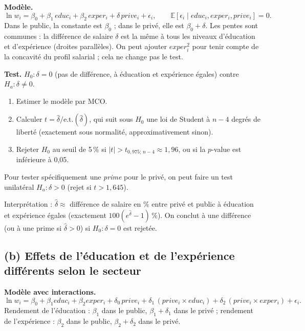 \documentclass[11pt,a4paper]{article}
\newcommand{\E}{\mathbb{E}}\newcommand{\Var}{\operatorname{Var}}\newcommand{\Cov}{\operatorname{Cov}}
\begin{document}
\textbf{Modèle.}
\[
\ln w_i=\beta_0+\beta_1\,educ_i+\beta_2\,exper_i+\delta\,prive_i+\epsilon_i,\qquad \E[\epsilon_i\mid educ_i,exper_i,prive_i]=0 .
\]
Dans le public, la constante est $\beta_0$ ; dans le privé, elle est $\beta_0+\delta$. Les pentes sont communes : la différence de salaire $\delta$ est la même à tous les niveaux d'éducation et d'expérience (droites parallèles). On peut ajouter $exper_i^2$ pour tenir compte de la concavité du profil salarial ; cela ne change pas le test.

\textbf{Test.} $H_0:\delta=0$ (pas de différence, à éducation et expérience égales) contre $H_a:\delta\neq0$.
\begin{enumerate}[nosep]
\item Estimer le modèle par MCO.
\item Calculer $t=\hat\delta/\text{e.t.}(\hat\delta)$, qui suit sous $H_0$ une loi de Student à $n-4$ degrés de liberté (exactement sous normalité, approximativement sinon).
\item Rejeter $H_0$ au seuil de 5\,\% si $|t|>t_{0{,}975;\,n-4}\approx1{,}96$, ou si la $p$-value est inférieure à 0,05.
\end{enumerate}
Pour tester spécifiquement une \emph{prime} pour le privé, on peut faire un test unilatéral $H_a:\delta>0$ (rejet si $t>1{,}645$).

\begin{reponse}
Interprétation : $\hat\delta\approx$ différence de salaire en \% entre privé et public à éducation et expérience égales (exactement $100(e^{\hat\delta}-1)\,\%$). On conclut à une différence (ou à une prime si $\hat\delta>0$) si $H_0:\delta=0$ est rejetée.
\end{reponse}

\subsection*{(b) Effets de l'éducation et de l'expérience différents selon le secteur}

\textbf{Modèle avec interactions.}
\[
\ln w_i=\beta_0+\beta_1 educ_i+\beta_2 exper_i+\delta_0\,prive_i+\delta_1\,(prive_i\times educ_i)+\delta_2\,(prive_i\times exper_i)+\epsilon_i .
\]
Rendement de l'éducation : $\beta_1$ dans le public, $\beta_1+\delta_1$ dans le privé ; rendement de l'expérience : $\beta_2$ dans le public, $\beta_2+\delta_2$ dans le privé.
\end{document}

